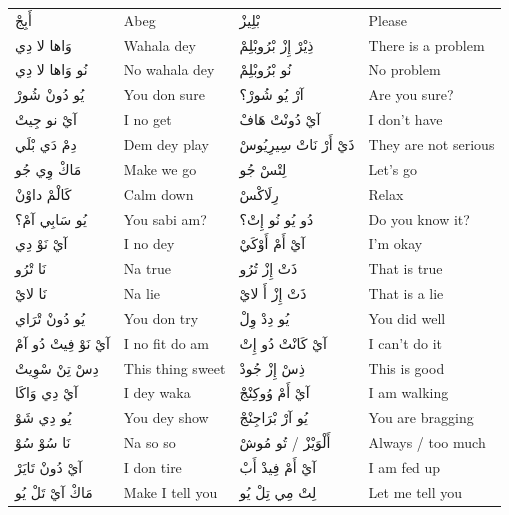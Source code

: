 \documentclass[12pt]{article}
\begin{document}
\begin{longtable}{p{3.2cm} p{3.2cm} p{3.2cm} p{3.2cm}}
أَبِجْ & Abeg & بْلِيزْ & Please \\
وَاها لا دِي & Wahala dey & ذِيْرْ إِزْ بْرُوبْلِمْ & There is a problem \\
نُو وَاها لا دِي & No wahala dey & نُو بْرُوبْلِمْ & No problem \\
يُو دُونْ شُورْ & You don sure & آرْ يُو شُورْ؟ & Are you sure? \\
آيْ نو جِيتْ & I no get & آيْ دُونْتْ هَافْ & I don’t have \\
دِمْ دَي بْلَي & Dem dey play & ذَيْ أَرْ نَاتْ سِيرِيُوسْ & They are not serious \\
مَاكْ وِي جُو & Make we go & لِتْسْ جُو & Let’s go \\
كَالْمْ داوْنْ & Calm down & رِلَاكْسْ & Relax \\
يُو سَابِي آمْ؟ & You sabi am? & دُو يُو نُو إِتْ؟ & Do you know it? \\
آيْ نَوْ دِي & I no dey & آيْ أَمْ أَوْكَيْ & I’m okay \\
نَا تْرُو & Na true & ذَتْ إِزْ تُرُو & That is true \\
نَا لايْ & Na lie & ذَتْ إِزْ أَ لايْ & That is a lie \\
يُو دُونْ تْرَاي & You don try & يُو دِدْ وِلْ & You did well \\
آيْ نَوْ فِيتْ دُو آمْ & I no fit do am & آيْ كَانْتْ دُو إِتْ & I can’t do it \\
دِسْ تِنْ سْوِيتْ & This thing sweet & ذِسْ إِزْ جُودْ & This is good \\
آيْ دِي وَاكَا & I dey waka & آيْ أَمْ وُوكِنْجْ & I am walking \\
يُو دِي شَوْ & You dey show & يُو آرْ بْرَاجِنْجْ & You are bragging \\
نَا سُوْ سُوْ & Na so so & أَلْوَيْزْ / تُو مُوشْ & Always / too much \\
آيْ دُونْ تَايَرْ & I don tire & آيْ أَمْ فِيدْ أَبْ & I am fed up \\
مَاكْ آيْ تَلْ يُو & Make I tell you & لِتْ مِي تِلْ يُو & Let me tell you \\


\end{longtable}
\end{document}
